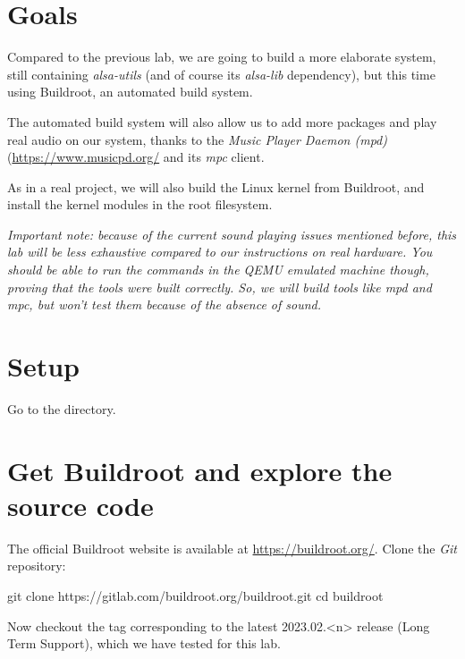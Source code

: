
\section{Goals}

Compared to the previous lab, we are going to build a more elaborate
system, still containing {\em alsa-utils} (and of course its {\em
alsa-lib} dependency), but this time using Buildroot,
an automated build system.

The automated build system will also allow us to add more packages
and play real audio on our system, thanks to the {\em Music Player
Daemon (mpd)} (\url{https://www.musicpd.org/} and its {\em mpc} client.

As in a real project, we will also build the Linux kernel from
Buildroot, and install the kernel modules in the root filesystem.

{\em Important note: because of the current sound playing issues
mentioned before, this lab will be less exhaustive compared to our
instructions on real hardware. You should be able to run the commands
in the QEMU emulated machine though, proving that the tools were built
correctly. So, we will build tools like mpd and mpc, but won't test
them because of the absence of sound.}

\section{Setup}

Go to the  directory.

\section{Get Buildroot and explore the source code}

The official Buildroot website is available at
\url{https://buildroot.org/}. Clone the {\em Git} repository:

\begin{bashinput}
git clone https://gitlab.com/buildroot.org/buildroot.git
cd buildroot
\end{bashinput}

Now checkout the tag corresponding to the latest 2023.02.<n> release (Long
Term Support), which we have tested for this lab.

